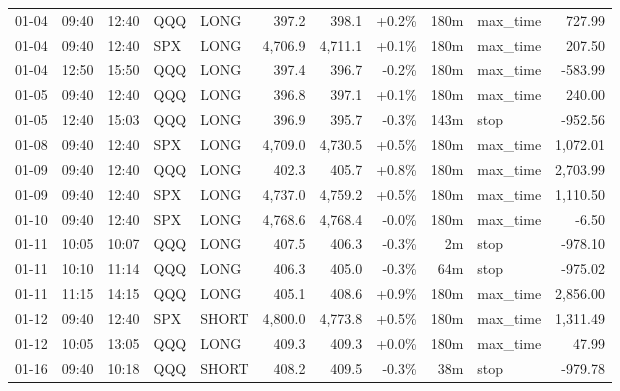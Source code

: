 \documentclass[11pt,a4paper,twoside]{article}
\begin{document}
\begin{center}
\begin{longtable}{>{\color{txtmain}}l l l l l r r r r >{\color{txtmain}}l r}
01-04 & 09:40 & 12:40 & QQQ & LONG & 397.2 & 398.1 & \textcolor{wingreen}{+0.2\%} & 180m & max\_time & \textcolor{wingreen}{727.99} \\
01-04 & 09:40 & 12:40 & SPX & LONG & 4,706.9 & 4,711.1 & \textcolor{wingreen}{+0.1\%} & 180m & max\_time & \textcolor{wingreen}{207.50} \\
01-04 & 12:50 & 15:50 & QQQ & LONG & 397.4 & 396.7 & \textcolor{lossred}{-0.2\%} & 180m & max\_time & \textcolor{lossred}{-583.99} \\
01-05 & 09:40 & 12:40 & QQQ & LONG & 396.8 & 397.1 & \textcolor{wingreen}{+0.1\%} & 180m & max\_time & \textcolor{wingreen}{240.00} \\
01-05 & 12:40 & 15:03 & QQQ & LONG & 396.9 & 395.7 & \textcolor{lossred}{-0.3\%} & 143m & stop & \textcolor{lossred}{-952.56} \\
01-08 & 09:40 & 12:40 & SPX & LONG & 4,709.0 & 4,730.5 & \textcolor{wingreen}{+0.5\%} & 180m & max\_time & \textcolor{wingreen}{1,072.01} \\
01-09 & 09:40 & 12:40 & QQQ & LONG & 402.3 & 405.7 & \textcolor{wingreen}{+0.8\%} & 180m & max\_time & \textcolor{wingreen}{2,703.99} \\
01-09 & 09:40 & 12:40 & SPX & LONG & 4,737.0 & 4,759.2 & \textcolor{wingreen}{+0.5\%} & 180m & max\_time & \textcolor{wingreen}{1,110.50} \\
01-10 & 09:40 & 12:40 & SPX & LONG & 4,768.6 & 4,768.4 & \textcolor{lossred}{-0.0\%} & 180m & max\_time & \textcolor{lossred}{-6.50} \\
01-11 & 10:05 & 10:07 & QQQ & LONG & 407.5 & 406.3 & \textcolor{lossred}{-0.3\%} & 2m & stop & \textcolor{lossred}{-978.10} \\
01-11 & 10:10 & 11:14 & QQQ & LONG & 406.3 & 405.0 & \textcolor{lossred}{-0.3\%} & 64m & stop & \textcolor{lossred}{-975.02} \\
01-11 & 11:15 & 14:15 & QQQ & LONG & 405.1 & 408.6 & \textcolor{wingreen}{+0.9\%} & 180m & max\_time & \textcolor{wingreen}{2,856.00} \\
01-12 & 09:40 & 12:40 & SPX & SHORT & 4,800.0 & 4,773.8 & \textcolor{wingreen}{+0.5\%} & 180m & max\_time & \textcolor{wingreen}{1,311.49} \\
01-12 & 10:05 & 13:05 & QQQ & LONG & 409.3 & 409.3 & \textcolor{wingreen}{+0.0\%} & 180m & max\_time & \textcolor{wingreen}{47.99} \\
01-16 & 09:40 & 10:18 & QQQ & SHORT & 408.2 & 409.5 & \textcolor{lossred}{-0.3\%} & 38m & stop & \textcolor{lossred}{-979.78} \\

\end{longtable}
\end{center}
\end{document}
